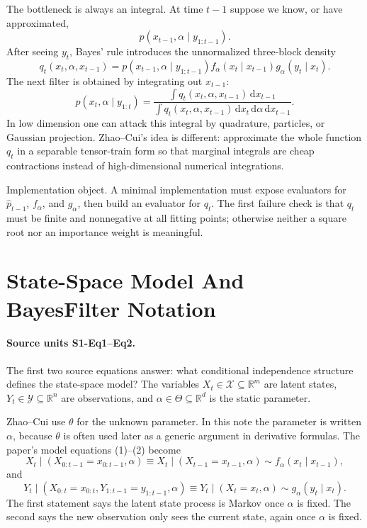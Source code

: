 \documentclass[11pt]{article}
\newcommand{\R}{\mathbb R}
\newcommand{\dd}{\,\mathrm d}
\begin{document}
The bottleneck is always an integral.  At time \(t-1\) suppose we know, or have
approximated,
\[
    p(x_{t-1},\alpha\mid y_{1:t-1}).
\]
After seeing \(y_t\), Bayes' rule introduces the unnormalized three-block
density
\[
    q_t(x_t,\alpha,x_{t-1})
    =
    p(x_{t-1},\alpha\mid y_{1:t-1})
    f_\alpha(x_t\mid x_{t-1})
    g_\alpha(y_t\mid x_t).
\]
The next filter is obtained by integrating out \(x_{t-1}\):
\[
    p(x_t,\alpha\mid y_{1:t})
    =
    \frac{\int q_t(x_t,\alpha,x_{t-1})\dd x_{t-1}}
    {\int q_t(x_t,\alpha,x_{t-1})\dd x_t\dd\alpha\dd x_{t-1}}.
\]
In low dimension one can attack this integral by quadrature, particles, or
Gaussian projection.  Zhao--Cui's idea is different: approximate the whole
function \(q_t\) in a separable tensor-train form so that marginal integrals are
cheap contractions instead of high-dimensional numerical integrations.

Implementation object.  A minimal implementation must expose evaluators for
\(\widehat p_{t-1}\), \(f_\alpha\), and \(g_\alpha\), then build an evaluator
for \(q_t\).  The first failure check is that \(q_t\) must be finite and
nonnegative at all fitting points; otherwise neither a square root nor an
importance weight is meaningful.

\section{State-Space Model And BayesFilter Notation}

\paragraph{Source units S1-Eq1--Eq2.}
The first two source equations answer: what conditional independence structure
defines the state-space model?  The variables \(X_t\in\mathcal X\subseteq\R^m\)
are latent states, \(Y_t\in\mathcal Y\subseteq\R^n\) are observations, and
\(\alpha\in\Theta\subseteq\R^d\) is the static parameter.

Zhao--Cui use \(\theta\) for the unknown parameter.  In this note the parameter
is written \(\alpha\), because \(\theta\) is often used later as a generic
argument in derivative formulas.  The paper's model equations (1)--(2) become
\[
    X_t\mid (X_{0:t-1}=x_{0:t-1},\alpha)
    \equiv
    X_t\mid (X_{t-1}=x_{t-1},\alpha)
    \sim f_\alpha(x_t\mid x_{t-1}),
    \tag{BF-1}
\]
and
\[
    Y_t\mid (X_{0:t}=x_{0:t},Y_{1:t-1}=y_{1:t-1},\alpha)
    \equiv
    Y_t\mid (X_t=x_t,\alpha)
    \sim g_\alpha(y_t\mid x_t).
    \tag{BF-2}
\]
The first statement says the latent state process is Markov once \(\alpha\) is
fixed.  The second says the new observation only sees the current state, again
once \(\alpha\) is fixed.
\end{document}
